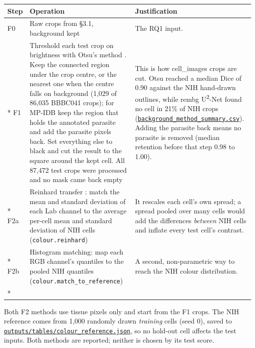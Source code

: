 \documentclass[11pt,a4paper]{article}
\begin{document}
{\small
\begin{longtable}{@{}>{\raggedright\arraybackslash\hspace{0pt}}p{25.5pt}>{\raggedright\arraybackslash\hspace{0pt}}p{160.2pt}>{\raggedright\arraybackslash\hspace{0pt}}p{138.3pt}@{}}
\toprule
Step & Operation & Justification \\
\midrule
\endhead
\bottomrule
\endfoot
\bottomrule
\endlastfoot
F0 & Raw crops from \S{}3.1, background kept & The RQ1 input. \\*
F1 & Threshold each test crop on brightness with Otsu's method \citep{otsu1979}. Keep the connected region under the crop centre, or the nearest one when the centre falls on background (1,029 of 86,035 BBBC041 crops); for MP-IDB keep the region that holds the annotated parasite and add the parasite pixels back. Set everything else to black and cut the result to the square around the kept cell. All 87,472 test crops were processed and no mask came back empty & This is how cell\_\allowbreak{}images crops are cut. Otsu reached a median Dice of 0.90 against the NIH hand-drawn outlines, while rembg U\textsuperscript{2}-Net found no cell in 21\% of NIH crops (\href{https://gitlab.uvt.nl/capstone/2026-fall/u927271/-/blob/v1.0-final/outputs/tables/background_method_summary.csv}{\texttt{background\_\allowbreak{}method\_\allowbreak{}summary.\allowbreak{}csv}}). Adding the parasite back means no parasite is removed (median retention before that step 0.98 to 1.00). \\*
F2a & Reinhard transfer \citep{reinhard2001}: match the mean and standard deviation of each Lab channel to the average per-cell mean and standard deviation of NIH cells (\texttt{colour.\allowbreak{}reinhard}) & It rescales each cell's own spread; a spread pooled over many cells would add the differences \emph{between} NIH cells and inflate every test cell's contrast. \\*
F2b & Histogram matching: map each RGB channel's quantiles to the pooled NIH quantiles (\texttt{colour.\allowbreak{}match\_\allowbreak{}to\_\allowbreak{}reference}) & A second, non-parametric way to reach the NIH colour distribution. \\*
\end{longtable}}
\addtocounter{table}{-1}

Both F2 methods use tissue pixels only and start from the F1 crops. The NIH reference comes from 1,000 randomly drawn \emph{training} cells (seed 0), saved to \href{https://gitlab.uvt.nl/capstone/2026-fall/u927271/-/blob/v1.0-final/outputs/tables/colour_reference.json}{\texttt{outputs/\allowbreak{}tables/\allowbreak{}colour\_\allowbreak{}reference.\allowbreak{}json}}, so no hold-out cell affects the test inputs. Both methods are reported; neither is chosen by its test score.
\end{document}
